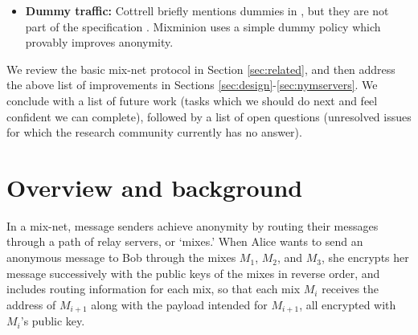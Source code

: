 \documentclass[11pt]{IEEEtran}
\begin{document}
\begin{itemize}
\item \textbf{Dummy traffic:} Cottrell briefly mentions dummies in
\cite{mixmaster-attacks}, but they are not part of the specification
\cite{mixmaster-spec}. Mixminion uses a simple dummy policy which provably
improves anonymity. %

\end{itemize}


We review the basic mix-net protocol in Section \ref{sec:related},
and then address the above list of improvements in Sections
\ref{sec:design}-\ref{sec:nymservers}. We conclude with a list of future
work (tasks which we should do next and feel confident we can complete),
followed by a list of open questions (unresolved issues for which the
research community currently has no answer).




\section{Overview and background}
%
In a mix-net, message senders achieve anonymity by routing their
messages through a path of relay servers, or `mixes.'  When Alice
wants to send an anonymous message to Bob through the mixes $M_1$,
$M_2$, and $M_3$, she encrypts her message successively with the
public keys of the mixes in reverse order, and includes routing
information for each mix, so that each mix $M_i$ receives the address
of $M_{i+1}$ along with the payload intended for $M_{i+1}$, all
encrypted with $M_i$'s public key.  
% 
\end{document}
